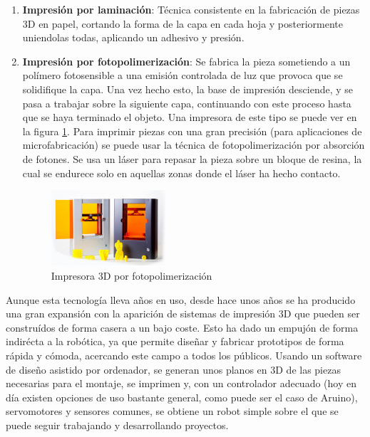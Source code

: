 \begin{enumerate}
\item \textbf{Impresión por laminación}: Técnica consistente en la fabricación de piezas 3D en papel, cortando la forma de la capa en cada hoja y posteriormente uniendolas todas, aplicando un adhesivo y presión.

\item \textbf{Impresión por fotopolimerización}: Se fabrica la pieza sometiendo a un polímero fotosensible a una emisión controlada de luz que provoca que se solidifique la capa. Una vez hecho esto, la base de impresión desciende, y se pasa a trabajar sobre la siguiente capa, continuando con este proceso hasta que se haya terminado el objeto. Una impresora de este tipo se puede ver en la figura \ref{fig:impresora_dlp}. Para imprimir piezas con una gran precisión (para aplicaciones de microfabricación) se puede usar la técnica de fotopolimerización por absorción de fotones. Se usa un láser para repasar la pieza sobre un bloque de resina, la cual se endurece solo en aquellas zonas donde el láser ha hecho contacto.\\

\begin{figure}[H]
        \centering
        \includegraphics[width=0.4\textwidth]{images/impresion_dlp.jpg}
        \caption{Impresora 3D por fotopolimerización}
        \label{fig:impresora_dlp}
\end{figure} 
    
\end{enumerate}

Aunque esta tecnología lleva años en uso, desde hace unos años se ha producido una gran expansión con la aparición de sistemas de impresión 3D que pueden ser construídos de forma casera a un bajo coste. Esto ha dado un empujón de forma indirécta a la robótica, ya que permite diseñar y fabricar prototipos de forma rápida y cómoda, acercando este campo a todos los públicos. Usando un software de diseño asistido por ordenador, se generan unos planos en 3D de las piezas necesarias para el montaje, se imprimen y, con un controlador adecuado (hoy en día existen opciones de uso bastante general, como puede ser el caso de Aruino), servomotores y sensores comunes, se obtiene un robot simple sobre el que se puede seguir trabajando y desarrollando proyectos.  

 